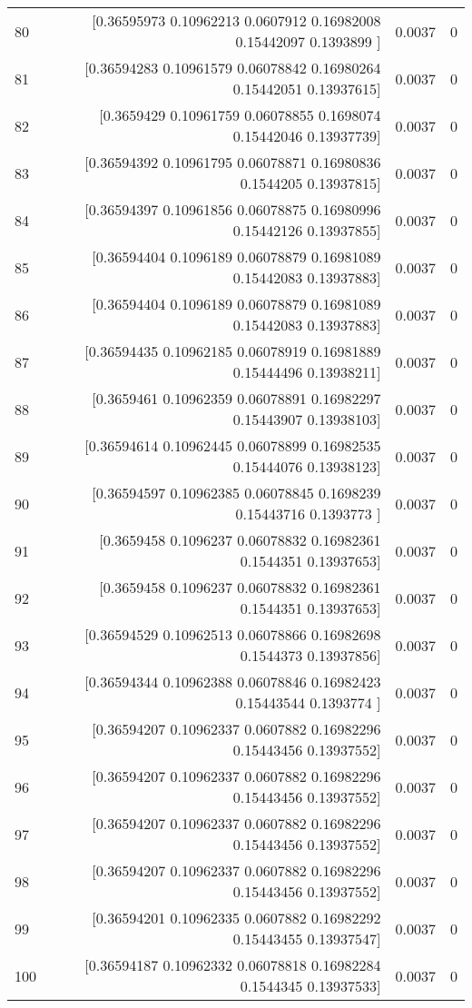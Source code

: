 \begin{longtable}{lrrr}
80 & [0.36595973 0.10962213 0.0607912  0.16982008 0.15442097 0.1393899 ] & 0.0037 & 0 \\
81 & [0.36594283 0.10961579 0.06078842 0.16980264 0.15442051 0.13937615] & 0.0037 & 0 \\
82 & [0.3659429  0.10961759 0.06078855 0.1698074  0.15442046 0.13937739] & 0.0037 & 0 \\
83 & [0.36594392 0.10961795 0.06078871 0.16980836 0.1544205  0.13937815] & 0.0037 & 0 \\
84 & [0.36594397 0.10961856 0.06078875 0.16980996 0.15442126 0.13937855] & 0.0037 & 0 \\
85 & [0.36594404 0.1096189  0.06078879 0.16981089 0.15442083 0.13937883] & 0.0037 & 0 \\
86 & [0.36594404 0.1096189  0.06078879 0.16981089 0.15442083 0.13937883] & 0.0037 & 0 \\
87 & [0.36594435 0.10962185 0.06078919 0.16981889 0.15444496 0.13938211] & 0.0037 & 0 \\
88 & [0.3659461  0.10962359 0.06078891 0.16982297 0.15443907 0.13938103] & 0.0037 & 0 \\
89 & [0.36594614 0.10962445 0.06078899 0.16982535 0.15444076 0.13938123] & 0.0037 & 0 \\
90 & [0.36594597 0.10962385 0.06078845 0.1698239  0.15443716 0.1393773 ] & 0.0037 & 0 \\
91 & [0.3659458  0.1096237  0.06078832 0.16982361 0.1544351  0.13937653] & 0.0037 & 0 \\
92 & [0.3659458  0.1096237  0.06078832 0.16982361 0.1544351  0.13937653] & 0.0037 & 0 \\
93 & [0.36594529 0.10962513 0.06078866 0.16982698 0.1544373  0.13937856] & 0.0037 & 0 \\
94 & [0.36594344 0.10962388 0.06078846 0.16982423 0.15443544 0.1393774 ] & 0.0037 & 0 \\
95 & [0.36594207 0.10962337 0.0607882  0.16982296 0.15443456 0.13937552] & 0.0037 & 0 \\
96 & [0.36594207 0.10962337 0.0607882  0.16982296 0.15443456 0.13937552] & 0.0037 & 0 \\
97 & [0.36594207 0.10962337 0.0607882  0.16982296 0.15443456 0.13937552] & 0.0037 & 0 \\
98 & [0.36594207 0.10962337 0.0607882  0.16982296 0.15443456 0.13937552] & 0.0037 & 0 \\
99 & [0.36594201 0.10962335 0.0607882  0.16982292 0.15443455 0.13937547] & 0.0037 & 0 \\
100 & [0.36594187 0.10962332 0.06078818 0.16982284 0.1544345  0.13937533] & 0.0037 & 0 \\

\end{longtable}
